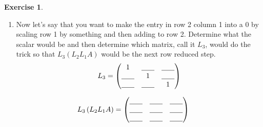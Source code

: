 \documentclass[
]{book}
\theoremstyle{definition}
\theoremstyle{definition}
\theoremstyle{definition}
\newtheorem{exercise}{Exercise}[chapter]
\theoremstyle{remark}
\begin{document}
\begin{exercise}
\begin{enumerate}
  \[ L_2 \left( L_1 A \right) = \begin{pmatrix} \underline{\hspace{0.25in}} & \underline{\hspace{0.25in}} & \underline{\hspace{0.25in}} \\ \underline{\hspace{0.25in}} & \underline{\hspace{0.25in}} & \underline{\hspace{0.25in}} \\ \underline{\hspace{0.25in}} & \underline{\hspace{0.25in}} & \underline{\hspace{0.25in}} \end{pmatrix} \]
  Pure insanity!!\\
\item
  Now let's say that you want to make the entry in row 2 column 1 into a 0 by scaling row 1 by something and then adding to row 2. Determine what the scalar would be and then determine which matrix, call it \(L_3\), would do the trick so that \(L_3 (L_2 L_1 A)\) would be the next row reduced step.
  \[ L_3 = \begin{pmatrix} 1 & \underline{\hspace{0.25in}} & \underline{\hspace{0.25in}} \\ \underline{\hspace{0.25in}} & 1 & \underline{\hspace{0.25in}} \\ \underline{\hspace{0.25in}} & \underline{\hspace{0.25in}} & 1 \end{pmatrix} \]
\end{enumerate}

\[ L_3 \left( L_2 L_1 A \right) = \begin{pmatrix} \underline{\hspace{0.25in}} & \underline{\hspace{0.25in}} & \underline{\hspace{0.25in}} \\ \underline{\hspace{0.25in}} & \underline{\hspace{0.25in}} & \underline{\hspace{0.25in}} \\ \underline{\hspace{0.25in}} & \underline{\hspace{0.25in}} & \underline{\hspace{0.25in}} \end{pmatrix} \]
\end{exercise}
\end{document}
